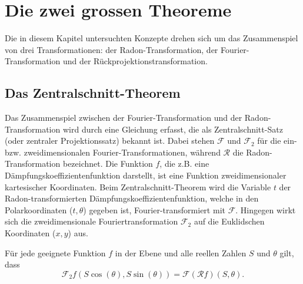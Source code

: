 %
%
%
%
\section{Die zwei grossen Theoreme
	\label{ct:section:theoreme}}
Die in diesem Kapitel untersuchten Konzepte drehen sich um das Zusammenspiel von drei Transformationen: der Radon-Transformation, der Fourier-Transformation und der Rückprojektionstransformation.

\subsection{Das Zentralschnitt-Theorem
	\label{ct:subsection:zentralschnitt}}
Das Zusammenspiel zwischen der Fourier-Transformation und der Radon-Transformation wird durch eine Gleichung erfasst, die als Zentralschnitt-Satz (oder zentraler Projektionssatz) bekannt ist. Dabei stehen $\mathscr{F}$ und $\mathscr{F}_2$ für die ein- bzw. zweidimensionalen Fourier-Transformationen, während $\mathscr{R}$ die Radon-Transformation bezeichnet. Die Funktion $f$, die z.B. eine Dämpfungskoeffizientenfunktion darstellt, ist eine Funktion zweidimensionaler kartesischer Koordinaten.
Beim Zentralschnitt-Theorem wird die Variable $t$ der Radon-transformierten Dämpfungskoeffizientenfunktion, welche in den Polarkoordinaten ($t, \theta$) gegeben ist, Fourier-transformiert mit $\mathscr{F}$. 
Hingegen wirkt sich die zweidimensionale Fouriertransformation  $\mathscr{F}_2$ auf die Euklidschen Koordinaten ($x, y$) aus.

\begin{satz}
Für jede geeignete Funktion $f$ in der Ebene und alle reellen Zahlen $S$ und $\theta$ gilt, dass
	\begin{equation}\label{2dFourier1}
		\mathscr{F}_2f(S\cos(\theta), S\sin(\theta)) = \mathscr{F}(\mathscr{R}f)(S, \theta).
	\end{equation}
\end{satz}

